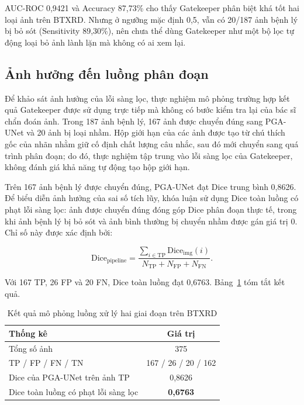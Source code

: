 AUC-ROC 0,9421 và Accuracy 87,73\% cho thấy Gatekeeper phân biệt khá tốt hai loại ảnh trên BTXRD. Nhưng ở ngưỡng mặc định 0,5, vẫn có 20/187 ảnh bệnh lý bị bỏ sót (Sensitivity 89,30\%), nên chưa thể dùng Gatekeeper như một bộ lọc tự động loại bỏ ảnh lành lặn mà không có ai xem lại.

\subsection{Ảnh hưởng đến luồng phân đoạn}
\label{sec:pipeline_eval}
\label{subsec:cascading_error}

Để khảo sát ảnh hưởng của lỗi sàng lọc, thực nghiệm mô phỏng trường hợp kết quả Gatekeeper được sử dụng trực tiếp mà không có bước kiểm tra lại của bác sĩ chẩn đoán ảnh. Trong 187 ảnh bệnh lý, 167 ảnh được chuyển đúng sang PGA-UNet và 20 ảnh bị loại nhầm. Hộp giới hạn của các ảnh được tạo từ chú thích gốc của nhãn nhằm giữ cố định chất lượng câu nhắc, sau đó mới chuyển sang quá trình phân đoạn; do đó, thực nghiệm tập trung vào lỗi sàng lọc của Gatekeeper, không đánh giá khả năng tự động tạo hộp giới hạn.

Trên 167 ảnh bệnh lý được chuyển đúng, PGA-UNet đạt Dice trung bình 0,8626. Để biểu diễn ảnh hưởng của sai số tích lũy, khóa luận sử dụng Dice toàn luồng có phạt lỗi sàng lọc: ảnh được chuyển đúng đóng góp Dice phân đoạn thực tế, trong khi ảnh bệnh lý bị bỏ sót và ảnh bình thường bị chuyển nhầm được gán giá trị 0. Chỉ số này được xác định bởi:

\begin{equation}
    \mathrm{Dice}_{\mathrm{pipeline}}
    =
    \frac{
        \displaystyle\sum_{i\in\mathrm{TP}}
        \mathrm{Dice}_{\mathrm{img}}(i)
    }{
        N_{\mathrm{TP}}+N_{\mathrm{FP}}+N_{\mathrm{FN}}
    }.
    \label{eq:pipeline_dice}
\end{equation}

Với 167 TP, 26 FP và 20 FN, Dice toàn luồng đạt 0,6763. Bảng~\ref{tab:pipeline_eval} tóm tắt kết quả.

\begin{table}[htbp]
    \centering
    \caption{Kết quả mô phỏng luồng xử lý hai giai đoạn trên BTXRD}
    \label{tab:pipeline_eval}
    \renewcommand{\arraystretch}{1.3}
    \begin{tabular}{|p{8cm}|c|}
        \hline
        \textbf{Thống kê} & \textbf{Giá trị} \\
        \hline
        Tổng số ảnh & 375 \\
        \hline
        TP / FP / FN / TN & 167 / 26 / 20 / 162 \\
        \hline
        Dice của PGA-UNet trên ảnh TP & 0,8626 \\
        \hline
        Dice toàn luồng có phạt lỗi sàng lọc & \textbf{0,6763} \\
        \hline
    \end{tabular}
\end{table}

